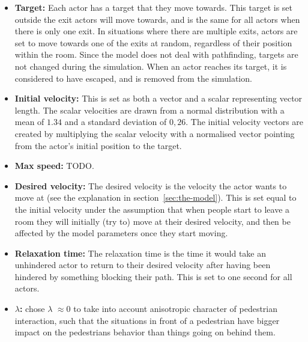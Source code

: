 \begin{itemize}
    \item \textbf{Target:} Each actor has a target that they move towards. 
        This target is set outside the exit actors will move towards, and is 
        the same for all actors when there is only one exit. In situations 
        where there are multiple exits, actors are set to move towards one of 
        the exits at random, regardless of their position within the room. 
        Since the model does not deal with pathfinding, targets are not 
        changed during the simulation. When an actor reaches its target, it is 
        considered to have escaped, and is removed from the simulation.

    \item \textbf{Initial velocity:} This is set as both a vector and a scalar 
        representing vector length. The scalar velocities are drawn from a 
        normal distribution with a mean of $1.34$ and a standard deviation of 
        $0,26$. The initial velocity vectors are created by multiplying the 
        scalar velocity with a normalised vector pointing from the actor's 
        initial position to the target.

    \item \textbf{Max speed:} TODO.

    \item \textbf{Desired velocity:} The desired velocity is the velocity the 
        actor wants to move at (see the explanation in 
        section~\ref{sec:the-model}). This is set equal to the initial velocity 
        under the assumption that when people start to leave a room they will 
        initially (try to) move at their desired velocity, and then be 
        affected by the model parameters once they start moving.

    \item \textbf{Relaxation time:} The relaxation time is the time it would 
        take an unhindered actor to return to their desired velocity after 
        having been hindered by something blocking their path. This is set to 
        one second for all actors.

    \item \textbf{$\lambda$:} \cite{self-org} chose $\lambda$ $\approx 0$ to take into account
	anisotropic character of pedestrian interaction, such that the situations in front of
	a pedestrian have bigger impact on the pedestrians behavior than things going on
	behind them.
\end{itemize}

